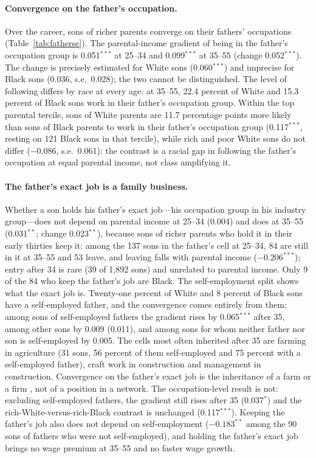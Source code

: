 \paragraph{Convergence on the father's occupation.} Over the career, sons of richer parents converge on their fathers'
occupations (Table~\ref{tab:fatherse}). The parental-income gradient of being in the father's occupation group is
0.051$^{***}$ at 25--34 and 0.099$^{***}$ at 35--55 (change 0.052$^{***}$). The change is precisely estimated for White
sons (0.060$^{***}$) and imprecise for Black sons (0.036, s.e.\ 0.028); the two cannot be distinguished. The level of
following differs by race at every age: at 35--55, 22.4 percent of White and 15.3 percent of Black sons work in their
father's occupation group. Within the top parental tercile, sons of White parents are 11.7 percentage points more likely
than sons of Black parents to work in their father's occupation group (0.117$^{***}$, resting on 121 Black sons in that
tercile), while rich and poor White sons do not differ ($-0.086$, s.e.\ 0.061): the contrast is a racial gap in
following the father's occupation at equal parental income, not class amplifying it.

\paragraph{The father's exact job is a family business.} Whether a son holds his father's exact job---his occupation
group in his industry group---does not depend on parental income at 25--34 (0.004) and does at 35--55 (0.031$^{**}$;
change 0.023$^{**}$), because sons of richer parents who hold it in their early thirties keep it: among the 137 sons in
the father's cell at 25--34, 84 are still in it at 35--55 and 53 leave, and leaving falls with parental income
($-0.206^{***}$); entry after 34 is rare (39 of 1,892 sons) and unrelated to parental income. Only 9 of the 84 who keep
the father's job are Black. The self-employment split shows what the exact job is. Twenty-one percent of White and 8
percent of Black sons have a self-employed father, and the convergence comes entirely from them: among sons of
self-employed fathers the gradient rises by 0.065$^{***}$ after 35, among other sons by 0.009 (0.011), and among sons
for whom neither father nor son is self-employed by 0.005. The cells most often inherited after 35 are farming in
agriculture (31 sons, 56 percent of them self-employed and 75 percent with a self-employed father), craft work in
construction and management in construction. Convergence on the father's exact job is the inheritance of a farm or a
firm \citep[the business and wealth transmission of][]{fagereng2021wealthy}, not of a position in a network. The
occupation-level result is not: excluding self-employed fathers, the gradient still rises after 35 (0.037$^{*}$) and the
rich-White-versus-rich-Black contrast is unchanged (0.117$^{***}$). Keeping the father's job also does not depend on
self-employment ($-0.183^{**}$ among the 90 sons of fathers who were not self-employed), and holding the father's exact
job brings no wage premium at 35--55 and no faster wage growth.

